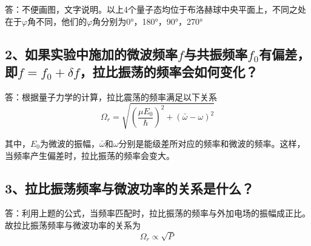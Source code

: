 \documentclass[a4paper]{article}
\begin{document}
答：不便画图，文字说明。以上4个量子态均位于布洛赫球中央平面上，不同之处在于$\varphi $角不同，他们的$\varphi $角分别为0°，180°，90°，270°
\subsection*{2、如果实验中施加的微波频率$ f $与共振频率$ f_0 $有偏差，即$ f = f_0 + \delta f $，拉比振荡的频率会如何变化？}
答：根据量子力学的计算，拉比震荡的频率满足以下关系$$\varOmega_r = \sqrt{(\frac{\mu E_0}{\hbar})^{2}+(\bar{\omega}-\omega)^{2}}$$

其中，$E_0$为微波的振幅，$\bar{\omega}$和$\omega$分别是能级差所对应的频率和微波的频率。这样，当频率产生偏差时，拉比振荡的频率会变大。
\subsection*{3、拉比振荡频率与微波功率的关系是什么？}
答：利用上题的公式，当频率匹配时，拉比振荡的频率与外加电场的振幅成正比。故拉比振荡频率与微波功率的关系为$$\varOmega_r \propto \sqrt{P}$$


\end{document}
